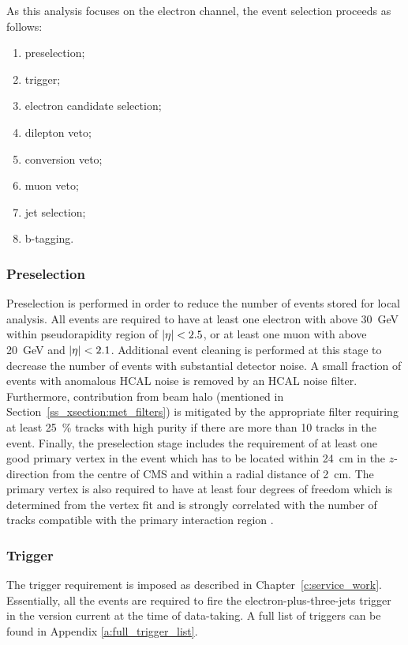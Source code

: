 As this analysis focuses on the electron channel, the event selection proceeds as follows:

\begin{enumerate}[topsep=\parskip, parsep=\parskip, itemsep=\parskip, leftmargin=\leftmargin]
	\item preselection;
	\item trigger;
	\item electron candidate selection;
	\item dilepton veto;
	\item conversion veto;
	\item muon veto;
	\item jet selection;
	\item b-tagging.
\end{enumerate}

\subsubsection*{Preselection}
Preselection is performed in order to reduce the number of events stored for local analysis. All events are required to
have at least one electron with \ET above \SI{30}{\GeV} within pseudorapidity region of $\lvert \eta \rvert < 2.5$, or at least
one muon with \pt above \SI{20}{\GeV} and $\lvert \eta \rvert < 2.1$. Additional event cleaning is performed at this stage to
decrease the number of events with substantial detector noise. A small fraction of events with anomalous HCAL noise is
removed by an HCAL noise filter. Furthermore, contribution from beam halo (mentioned in
Section~\ref{ss_xsection:met_filters}) is mitigated by the appropriate filter requiring at least \SI{25}{\percent}
tracks with high purity if there are more than \num{10} tracks in the event. Finally, the preselection stage includes
the requirement of at least one good primary vertex in the event which has to be located within
\SI{24}{\cm} in the $z$-direction from the centre of CMS and within a radial distance of \SI{2}{\cm}. The primary vertex
is also required to have at least four degrees of freedom which is determined from the vertex fit and is strongly
correlated with the number of tracks compatible with the primary interaction region \autocite{Tacking_PV_results_7TeV}.


\subsubsection*{Trigger}
The trigger requirement is imposed as described in Chapter~\ref{c:service_work}. Essentially, all the events are
required to fire the electron-plus-three-jets trigger in the version current at the time of data-taking. A full list of
triggers can be found in Appendix \ref{a:full_trigger_list}.

